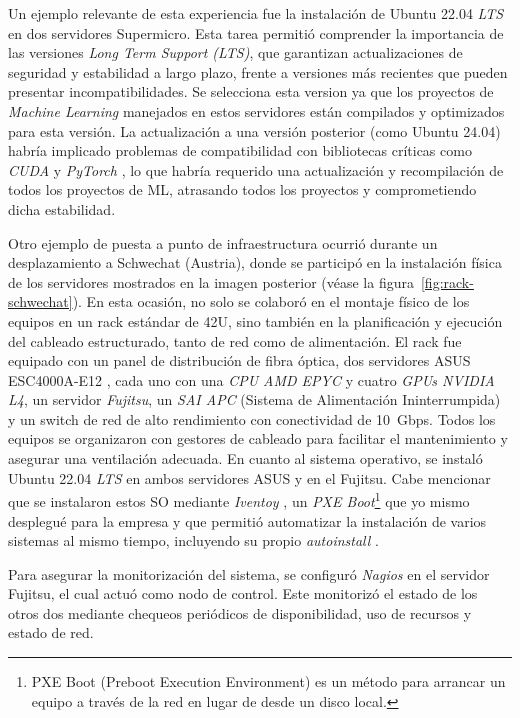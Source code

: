 Un ejemplo relevante de esta experiencia fue la instalación de Ubuntu 22.04 \textit{LTS} en dos servidores Supermicro. Esta tarea permitió comprender la importancia de las versiones \textit{Long Term Support (LTS)}, que garantizan actualizaciones de seguridad y estabilidad a largo plazo, frente a versiones más recientes que pueden presentar incompatibilidades. Se selecciona esta version ya que los proyectos de \textit{Machine Learning} manejados en estos servidores están compilados y optimizados para esta versión. La actualización a una versión posterior (como Ubuntu 24.04) habría implicado problemas de compatibilidad con bibliotecas críticas como \textit{CUDA} \cite{ref24} y \textit{PyTorch} \cite{ref55}, lo que habría requerido una actualización y recompilación de todos los proyectos de ML, atrasando todos los proyectos y comprometiendo dicha estabilidad. 

Otro ejemplo de puesta a punto de infraestructura ocurrió durante un desplazamiento a Schwechat (Austria), donde se participó en la instalación física de los servidores mostrados en la imagen posterior (véase la figura~\ref{fig:rack-schwechat}). En esta ocasión, no solo se colaboró en el montaje físico de los equipos en un rack estándar de 42U, sino también en la planificación y ejecución del cableado estructurado, tanto de red como de alimentación. El rack fue equipado con un panel de distribución de fibra óptica, dos servidores ASUS ESC4000A-E12 \cite{ref79}, cada uno con una \textit{CPU AMD EPYC} y cuatro \textit{GPUs NVIDIA L4}, un servidor \textit{Fujitsu}, un \textit{SAI APC} (Sistema de Alimentación Ininterrumpida) y un switch de red de alto rendimiento con conectividad de 10~Gbps. Todos los equipos se organizaron con gestores de cableado para facilitar el mantenimiento y asegurar una ventilación adecuada. En cuanto al sistema operativo, se instaló Ubuntu 22.04 \textit{LTS} en ambos servidores ASUS y en el Fujitsu. Cabe mencionar que se instalaron estos SO mediante \textit{Iventoy} \cite{ref49}, un \textit{PXE Boot}\footnote{PXE Boot (Preboot Execution Environment) es un método para arrancar un equipo a través de la red en lugar de desde un disco local.} que yo mismo desplegué para la empresa y que permitió automatizar la instalación de varios sistemas al mismo tiempo, incluyendo su propio \textit{autoinstall} \cite{ref73}.

Para asegurar la monitorización del sistema, se configuró \textit{Nagios} en el servidor Fujitsu, el cual actuó como nodo de control. Este monitorizó el estado de los otros dos mediante chequeos periódicos de disponibilidad, uso de recursos y estado de red. 


